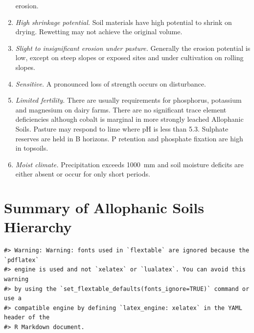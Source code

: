 \documentclass[
  letterpaper,
  DIV=11,
  numbers=noendperiod]{scrreprt}
\begin{document}
\begin{enumerate}
  erosion.
\item
  \emph{High shrinkage potential.} Soil materials have high potential to
  shrink on drying. Rewetting may not achieve the original volume.
\item
  \emph{Slight to insignificant erosion under pasture.} Generally the
  erosion potential is low, except on steep slopes or exposed sites and
  under cultivation on rolling slopes.
\item
  \emph{Sensitive.} A pronounced loss of strength occurs on disturbance.
\item
  \emph{Limited fertility.} There are usually requirements for
  phosphorus, potassium and magnesium on dairy farms. There are no
  significant trace element deficiencies although cobalt is marginal in
  more strongly leached Allophanic Soils. Pasture may respond to lime
  where pH is less than 5.3. Sulphate reserves are held in B horizons. P
  retention and phosphate fixation are high in topsoils.
\item
  \emph{Moist climate.} Precipitation exceeds 1000~mm and soil moisture
  deficits are either absent or occur for only short periods.
\end{enumerate}

\hypertarget{sec-sum-L}{%
\section{Summary of Allophanic Soils Hierarchy}\label{sec-sum-L}}

\begin{verbatim}
#> Warning: Warning: fonts used in `flextable` are ignored because the `pdflatex`
#> engine is used and not `xelatex` or `lualatex`. You can avoid this warning
#> by using the `set_flextable_defaults(fonts_ignore=TRUE)` command or use a
#> compatible engine by defining `latex_engine: xelatex` in the YAML header of the
#> R Markdown document.
\end{verbatim}

\providecommand{\docline}[3]{\noalign{\global\setlength{\arrayrulewidth}{#1}}\arrayrulecolor[HTML]{#2}\cline{#3}}

\setlength{\tabcolsep}{2pt}

\renewcommand*{\arraystretch}{1.5}
\end{document}
